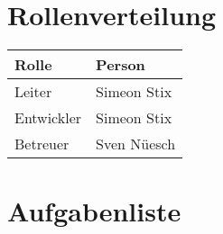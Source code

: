 \section{Rollenverteilung}
\label{sec:PlanungRollenverteilung}
\begin{table}[H]
	\centering
	\begin{xltabular}{\linewidth}{|l|X|}
		\hline
		\textbf{Rolle} & \textbf{Person}
		\\\hline
		Leiter & Simeon Stix
		\\\hline
		Entwickler & Simeon Stix
		\\\hline
		Betreuer & Sven Nüesch
		\\\hline
	\end{xltabular}
	\label{tab:planungrollenverteilungtable}
\end{table}
\section{Aufgabenliste} 
\label{sec:PlanungAufgabenliste} 
